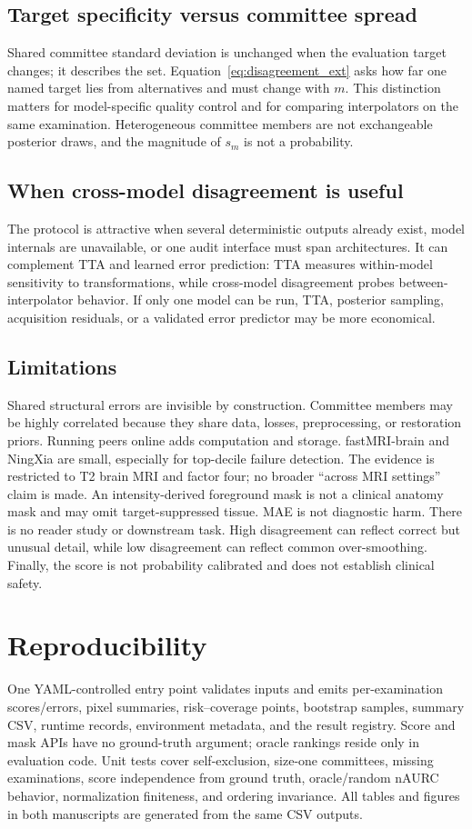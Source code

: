 \documentclass{article}
\begin{document}
\subsection{Target specificity versus committee spread}
Shared committee standard deviation is unchanged when the evaluation target changes; it describes the set. Equation~\eqref{eq:disagreement_ext} asks how far one named target lies from alternatives and must change with $m$. This distinction matters for model-specific quality control and for comparing interpolators on the same examination. Heterogeneous committee members are not exchangeable posterior draws, and the magnitude of $s_m$ is not a probability.

\subsection{When cross-model disagreement is useful}
The protocol is attractive when several deterministic outputs already exist, model internals are unavailable, or one audit interface must span architectures. It can complement TTA and learned error prediction: TTA measures within-model sensitivity to transformations, while cross-model disagreement probes between-interpolator behavior. If only one model can be run, TTA, posterior sampling, acquisition residuals, or a validated error predictor may be more economical.

\subsection{Limitations}
Shared structural errors are invisible by construction. Committee members may be highly correlated because they share data, losses, preprocessing, or restoration priors. Running peers online adds computation and storage. fastMRI-brain and NingXia are small, especially for top-decile failure detection. The evidence is restricted to T2 brain MRI and factor four; no broader ``across MRI settings'' claim is made. An intensity-derived foreground mask is not a clinical anatomy mask and may omit target-suppressed tissue. MAE is not diagnostic harm. There is no reader study or downstream task. High disagreement can reflect correct but unusual detail, while low disagreement can reflect common over-smoothing. Finally, the score is not probability calibrated and does not establish clinical safety.

\section{Reproducibility}
One YAML-controlled entry point validates inputs and emits per-examination scores/errors, pixel summaries, risk--coverage points, bootstrap samples, summary CSV, runtime records, environment metadata, and the result registry. Score and mask APIs have no ground-truth argument; oracle rankings reside only in evaluation code. Unit tests cover self-exclusion, size-one committees, missing examinations, score independence from ground truth, oracle/random nAURC behavior, normalization finiteness, and ordering invariance. All tables and figures in both manuscripts are generated from the same CSV outputs.
\end{document}
